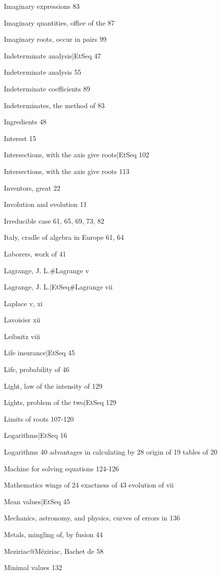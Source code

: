 \documentclass[12pt]{book}[2005/09/16]
\newcommand{\PageSep}[1]{\ignorespaces}
\begin{document}
Imaginary expressions 83

Imaginary quantities, office of the 87

Imaginary roots, occur in pairs 99

Indeterminate analysis|EtSeq 47 %

Indeterminate analysis 55

Indeterminate coefficients 89

Indeterminates, the method of 83

Ingredients 48

Interest 15

Intersections, with the axis give roots|EtSeq 102 %

Intersections, with the axis give roots 113

Inventors, great 22

Involution and evolution 11

Irreducible case 61, 65, 69, 73, 82

Italy, cradle of algebra in Europe 61, 64

Laborers, work of 41

Lagrange, J. L.#Lagrange v

Lagrange, J. L.|EtSeq#Lagrange vii %
\PageSep{155}

Laplace v, xi

Lavoisier xii

Leibnitz viii

Life insurance|EtSeq 45 %

Life, probability of 46

Light, law of the intensity of 129

Lights, problem of the two|EtSeq 129 %

Limits of roots 107-120

Logarithms|EtSeq 16 %

Logarithms 40
  advantages in calculating by 28
  origin of 19
  tables of 20

Machine for solving equations 124-126

Mathematics
  wings of 24
  exactness of 43
  evolution of vii

Mean values|EtSeq 45 %

Mechanics, astronomy, and physics, curves of errors in 136

Metals, mingling of, by fusion 44

Meziriac@Méziriac, Bachet de 58

Minimal values 132
\end{document}
